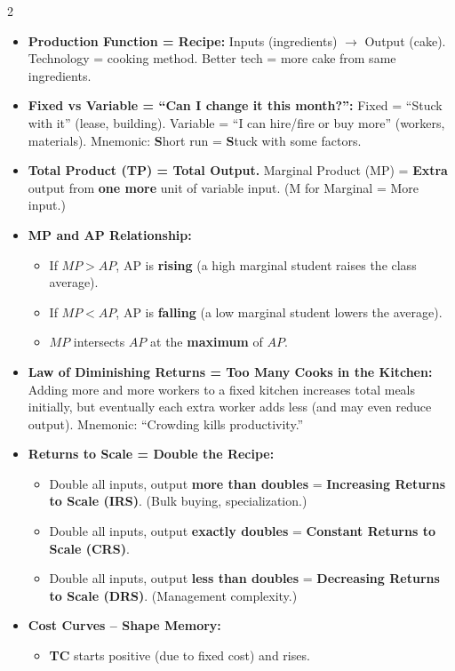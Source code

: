 \documentclass[10pt,a4paper]{article}
\begin{document}
\begin{multicols}{2}
\begin{itemize}[leftmargin=*,nosep]
    \item \textbf{Production Function = Recipe:} Inputs (ingredients) $\to$ Output (cake). Technology = cooking method. Better tech = more cake from same ingredients.
    \item \textbf{Fixed vs Variable = ``Can I change it this month?'':} Fixed = ``Stuck with it'' (lease, building). Variable = ``I can hire/fire or buy more'' (workers, materials). Mnemonic: \textbf{S}hort run = \textbf{S}tuck with some factors.
    \item \textbf{Total Product (TP) = Total Output.} Marginal Product (MP) = \textbf{Extra} output from \textbf{one more} unit of variable input. (M for Marginal = More input.)
    \item \textbf{MP and AP Relationship:}
    \begin{itemize}[nosep]
        \item If $MP > AP$, AP is \textbf{rising} (a high marginal student raises the class average).
        \item If $MP < AP$, AP is \textbf{falling} (a low marginal student lowers the average).
        \item $MP$ intersects $AP$ at the \textbf{maximum} of $AP$.
    \end{itemize}
    \item \textbf{Law of Diminishing Returns = Too Many Cooks in the Kitchen:} Adding more and more workers to a fixed kitchen increases total meals initially, but eventually each extra worker adds less (and may even reduce output). Mnemonic: ``Crowding kills productivity.''
    \item \textbf{Returns to Scale = Double the Recipe:}
    \begin{itemize}[nosep]
        \item Double all inputs, output \textbf{more than doubles} = \textbf{Increasing Returns to Scale (IRS)}. (Bulk buying, specialization.)
        \item Double all inputs, output \textbf{exactly doubles} = \textbf{Constant Returns to Scale (CRS)}.
        \item Double all inputs, output \textbf{less than doubles} = \textbf{Decreasing Returns to Scale (DRS)}. (Management complexity.)
    \end{itemize}
    \item \textbf{Cost Curves -- Shape Memory:}
    \begin{itemize}[nosep]
        \item \textbf{TC} starts positive (due to fixed cost) and rises.

\end{itemize}
\end{itemize}
\end{multicols}
\end{document}
